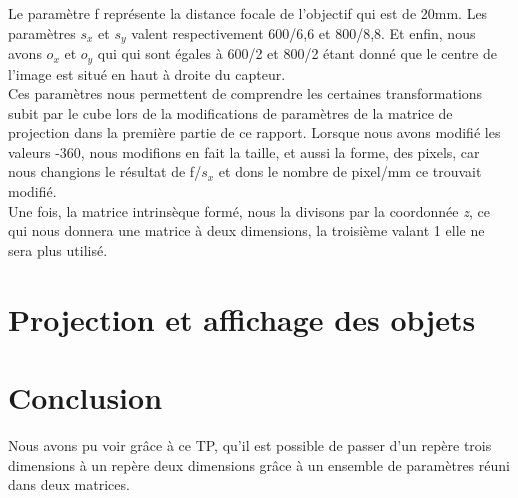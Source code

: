 \documentclass[a4paper,11pt]{article}
\begin{document}
  Le paramètre f représente la distance focale de l'objectif qui est de 20mm. Les paramètres $s_x$ et $s_y$
  valent respectivement 600/6,6 et 800/8,8. Et enfin, nous avons $o_x$ et $o_y$ qui qui sont égales à 
  600/2 et 800/2 étant donné que le centre de l'image est situé en haut à droite du capteur.\\
     
  Ces paramètres nous permettent de comprendre les certaines transformations subit par le cube lors
  de la modifications de paramètres de la matrice de projection dans la première partie de ce rapport.
  Lorsque nous avons modifié les valeurs -360, nous modifions en fait la taille, et aussi la forme,
  des pixels, car nous changions le résultat de f/$s_x$ et dons le nombre de pixel/mm ce trouvait modifié.\\
  
  Une fois, la matrice intrinsèque formé, nous la divisons par la coordonnée \textit{z},
  ce qui nous donnera une matrice à deux dimensions, la troisième valant 1 elle ne sera
  plus utilisé.
     
  \section{Projection et affichage des objets}
  
  
  \section*{Conclusion}
  Nous avons pu voir grâce à ce TP, qu'il est possible de passer d'un repère trois dimensions à un repère deux
  dimensions grâce à un ensemble de paramètres réuni dans deux matrices.
    
\end{document}
